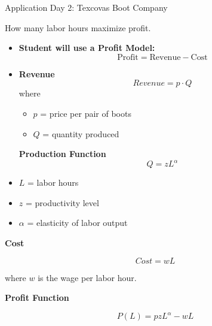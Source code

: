 \documentclass[dvipsnames]{beamer}
\begin{document}

\begin{frame}{Application Day 2: Texcovas Boot Company}

How many labor hours maximize profit.
\begin{itemize}
\item \textbf{Student will use a Profit Model:}
\[
\text{Profit} = \text{Revenue} - \text{Cost}
\]
\item \textbf{Revenue}
\[
Revenue = p \cdot Q
\]
where
\begin{itemize}
\item $p$ = price per pair of boots
\item $Q$ = quantity produced
\end{itemize}
\textbf{Production Function}
\[
Q = zL^{\alpha}
\]
\end{itemize}

\begin{itemize}
\item $L$ = labor hours
\item $z$ = productivity level
\item $\alpha$ = elasticity of labor output
\end{itemize}
\end{frame}
\begin{frame}
\textbf{Cost}

\[
Cost = wL
\]

where $w$ is the wage per labor hour.

\bigskip

\textbf{Profit Function}

\[
P(L) = pzL^{\alpha} - wL
\]

\end{frame}

\end{document}
